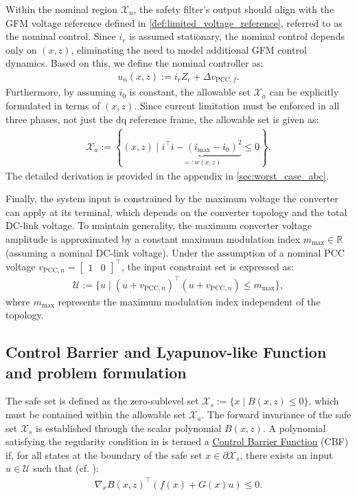 \documentclass[lettersize,journal]{IEEEtran}
\newcommand{\R}{\mathbb{R}}
\newcommand{\markAsChanged}[1]{{\color{black}#1}}
\begin{document}
\markAsChanged{Within the nominal region $\mathcal X_n$, the safety filter's output should align with the GFM voltage reference defined in \cref{def:limited_voltage_reference}, referred to as the nominal control.
Since $i_r$ is assumed stationary, the nominal control depends only on $(x, z)$, eliminating the need to model additional GFM control dynamics.}
Based on this, we define the nominal controller as:
\begin{align} \label{eq:nominal_control_action}
   u_n(x, z) := i_r Z_c + \Delta v_{\text{PCC},f}.
\end{align}
Furthermore, by assuming $i_0$ is constant, the allowable set $\mathcal X_a$ can be explicitly formulated in terms of $(x, z)$.
Since current limitation must be enforced in all three phases, not just the dq reference frame, the allowable set is given as:
\begin{align} \label{eq:allowable_set}
   \mathcal X_a := \left \{ (x,z) \mid \underbrace{i^\top i - (i_\text{max} - i_0)^2}_{=: w(x,z)} \leq 0 \right \}.
\end{align}
The detailed derivation is provided in the appendix in \cref{sec:worst_case_abc}.

Finally, the system input is constrained by the maximum voltage the converter can apply at its terminal, which depends on the converter topology and the total DC-link voltage.
To maintain generality, the maximum converter voltage amplitude is approximated by a constant maximum modulation index $m_\text{max} \in \R$ (assuming a nominal DC-link voltage).
Under the assumption of a nominal PCC voltage $v_{\text{PCC},n} = \begin{bmatrix}1 & 0\end{bmatrix}^\top$, the input constraint set is expressed as:
\begin{align} \label{eq:input_constraint_set}
   \mathcal U := \{ u \mid (u + v_{\text{PCC},n})^\top (u + v_{\text{PCC},n}) \leq m_\text{max} \},
\end{align}
where $m_\text{max}$ represents the maximum modulation index independent of the topology.



\subsection{Control Barrier and Lyapunov-like Function and problem formulation}

The safe set is defined as the zero-sublevel set $\mathcal X_s := \{ x \mid B(x,z) \leq 0 \}$, which must be contained within the allowable set $\mathcal X_a$.
The forward invariance of the safe set $\mathcal X_s$ is established through the scalar polynomial $B(x, z)$.
A polynomial satisfying the regularity condition in \cite[Definition 4.9]{Blanchini:99} is termed a \underline{Control Barrier Function} (CBF) if, for all states at the boundary of the safe set $x \in \partial \mathcal X_s$, there exists an input $u \in \mathcal U$ such that (cf. \cite[Nagumo's Theorem 4.7]{Blanchini:99}):
\begin{align} \label{eq:cbf_condition}
    \nabla_x B(x,z)^\top \left ( f(x) + G(x) u \right ) \leq 0.
\end{align}
\end{document}
